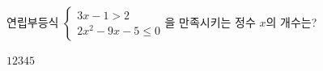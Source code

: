 연립부등식 $\begin{cases} 3x-1>2 \\ 2x^2-9x-5\le 0 \end{cases}$을 만족시키는 정수 $x$의 개수는?
\begin{choices32}{$1$}{$2$}{$3$}{$4$}{$5$}\end{choices32}
